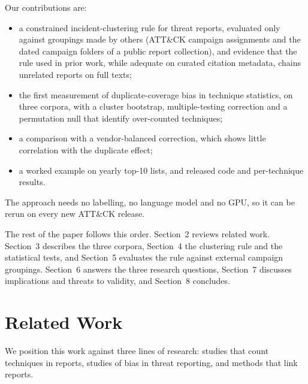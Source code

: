 \documentclass[runningheads]{llncs}
\newcommand{\attack}{ATT\&CK}
\begin{document}
\noindent Our contributions are:
\begin{itemize}
\item a constrained incident-clustering rule for threat reports, evaluated only against groupings made by others (\attack{} campaign assignments and the dated campaign folders of a public report collection), and evidence that the rule used in prior work, while adequate on curated citation metadata, chains unrelated reports on full texts;
\item the first measurement of duplicate-coverage bias in technique statistics, on three corpora, with a cluster bootstrap, multiple-testing correction and a permutation null that identify over-counted techniques;
\item a comparison with a vendor-balanced correction, which shows little correlation with the duplicate effect;
\item a worked example on yearly top-10 lists, and released code and per-technique results.
\end{itemize}

The approach needs no labelling, no language model and no GPU, so it can be rerun on every new \attack{} release.

The rest of the paper follows this order. Section~2 reviews related work. Section~3 describes the three corpora, Section~4 the clustering rule and the statistical tests, and Section~5 evaluates the rule against external campaign groupings. Section~6 answers the three research questions, Section~7 discusses implications and threats to validity, and Section~8 concludes.

\section{Related Work}

We position this work against three lines of research: studies that count techniques in reports, studies of bias in threat reporting, and methods that link reports.
\end{document}
